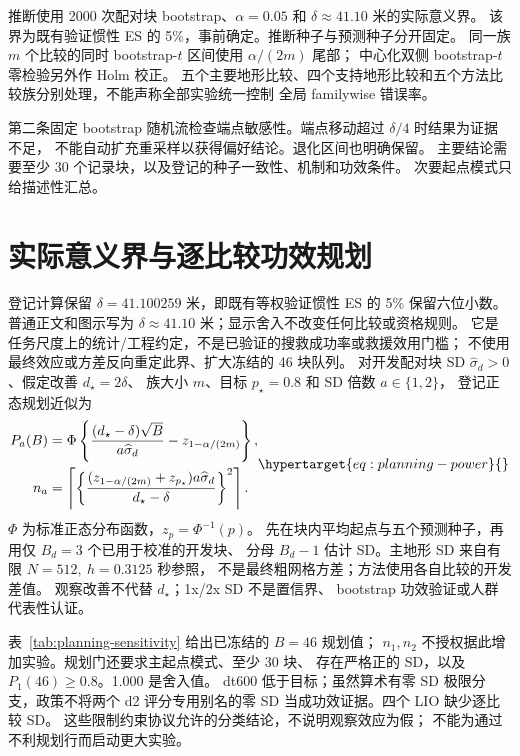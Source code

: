 推断使用 2000 次配对块 bootstrap、\(\alpha=0.05\) 和 \(\delta\approx41.10\) 米的实际意义界。
该界为既有验证惯性 ES 的 5\%，事前确定。推断种子与预测种子分开固定。
同一族 \(m\) 个比较的同时 bootstrap-\(t\) 区间使用 \(\alpha/(2m)\) 尾部；
中心化双侧 bootstrap-\(t\) 零检验另外作 Holm 校正。
五个主要地形比较、四个支持地形比较和五个方法比较族分别处理，不能声称全部实验统一控制
全局 familywise 错误率。

第二条固定 bootstrap 随机流检查端点敏感性。端点移动超过 \(\delta/4\) 时结果为证据不足，
不能自动扩充重采样以获得偏好结论。退化区间也明确保留。
主要结论需要至少 30 个记录块，以及登记的种子一致性、机制和功效条件。
次要起点模式只给描述性汇总。


\section{实际意义界与逐比较功效规划}
\label{sec:planning-qualification}\hypertarget{sec:planning-qualification}{}
登记计算保留 \(\delta=41.100259\) 米，即既有等权验证惯性 ES 的 5\% 保留六位小数。
普通正文和图示写为 \(\delta\approx41.10\) 米；显示舍入不改变任何比较或资格规则。
它是任务尺度上的统计/工程约定，不是已验证的搜救成功率或救援效用门槛；
不使用最终效应或方差反向重定此界、扩大冻结的 46 块队列。
对开发配对块 SD \(\widehat\sigma_d>0\)、假定改善 \(d_\star=2\delta\)、
族大小 \(m\)、目标 \(p_\star=0.8\) 和 SD 倍数 \(a\in\{1,2\}\)，
登记正态规划近似为
\begin{equation}
\begin{aligned}
 P_a(B)&=\Phi\left\{\frac{(d_\star-\delta)\sqrt B}{a\widehat\sigma_d}
                         -z_{1-\alpha/(2m)}\right\},\\
 n_a&=\left\lceil\left\{\frac{(z_{1-\alpha/(2m)}+z_{p_\star})a\widehat\sigma_d}
                              {d_\star-\delta}\right\}^{2}\right\rceil .
\end{aligned}
\label{eq:planning-power}\hypertarget{eq:planning-power}{}
\end{equation}
\(\Phi\) 为标准正态分布函数，\(z_p=\Phi^{-1}(p)\)。
先在块内平均起点与五个预测种子，再用仅 \(B_d=3\) 个已用于校准的开发块、
分母 \(B_d-1\) 估计 SD。主地形 SD 来自有限 \(N=512,\ h=0.3125\) 秒参照，
不是最终粗网格方差；方法使用各自比较的开发差值。
观察改善不代替 \(d_\star\)；1x/2x SD 不是置信界、
bootstrap 功效验证或人群代表性认证。

表~\ref{tab:planning-sensitivity} 给出已冻结的 \(B=46\) 规划值；
\(n_1,n_2\) 不授权据此增加实验。规划门还要求主起点模式、至少 30 块、
存在严格正的 SD，以及 \(P_1(46)\geq0.8\)。1.000 是舍入值。
dt600 低于目标；虽然算术有零 SD 极限分支，政策不将两个 d2
评分专用别名的零 SD 当成功效证据。四个 LIO 缺少逐比较 SD。
这些限制约束协议允许的分类结论，不说明观察效应为假；
不能为通过不利规划行而启动更大实验。

